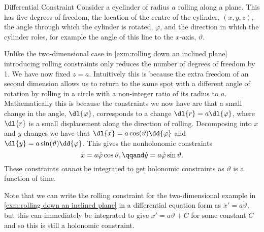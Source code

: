 \documentclass[fleqn]{NotesClass}
\begin{document}
    \begin{exm}{Differential Constraint}{}
        Consider a cyclinder of radius \(a\) rolling along a plane.
        This has five degrees of freedom, the location of the centre of the cylinder, \((x, y, z)\), the angle through which the cylinder is rotated, \(\varphi\), and the direction in which the cylinder roles, for example the angle of this line to the \(x\)-axis, \(\vartheta\).
        
        Unlike the two-dimensional case in \cref{exm:rolling down an inclined plane} introducing rolling constraints only reduces the number of degrees of freedom by 1.
        We have now fixed \(z = a\).
        Intuitively this is because the extra freedom of an second dimension allows us to return to the same spot with a different angle of rotation by rolling in a circle with a non-integer ratio of its radius to \(a\).
        Mathematically this is because the constraints we now have are that a small change in the angle, \(\dl{\varphi}\), corresponds to a change \(\dl{r} = a\dl{\varphi}\), where \(\dl{r}\) is a small displacement along the direction of rolling.
        Decomposing into \(x\) and \(y\) changes we have that \(\dl{x} = a\cos(\vartheta)\dd{\varphi}\) and \(\dl{y} = a\sin(\vartheta)\dd{\varphi}\).
        This gives the nonholonomic constraints
        \begin{equation}
            \dot{x} = a\dot{\varphi}\cos\vartheta, \qqand \dot{y} = a\dot{\varphi}\sin\vartheta.
        \end{equation}
        These constraints \emph{cannot} be integrated to get holonomic constraints as \(\vartheta\) is a function of time.
        
        Note that we can write the rolling constraint for the two-dimensional example in \cref{exm:rolling down an inclined plane} in a differential equation form as \(\dot{x}' = a\dot{\vartheta}\), but this can immediately be integrated to give \(x' = a\vartheta + C\) for some constant \(C\) and so this is still a holonomic constraint.
    \end{exm}
\end{document}

